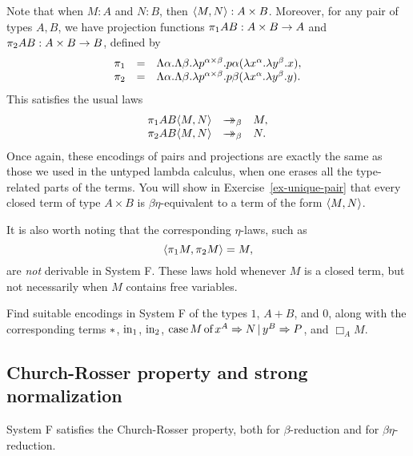 \documentclass{article}
\begin{document}
Note that when $M:A$ and $N:B$, then $\langle M,N\rangle:A\times B$. Moreover,
for any pair of types $A,B$, we have projection
functions $\pi_1 AB : A\times B\to A$ and $\pi_2 AB : A\times B\to
B$, defined by
\[ \begin{array}{ccl}
  \pi_1 &=& \Lambda\alpha.\Lambda\beta.\lambda p^{\alpha\times
    \beta}.p\alpha(\lambda x^{\alpha}.\lambda y^{\beta}.x),\\
  \pi_2 &=& \Lambda\alpha.\Lambda\beta.\lambda p^{\alpha\times
    \beta}.p\beta(\lambda x^{\alpha}.\lambda y^{\beta}.y).
\end{array}
\]
This satisfies the usual laws
\[ \begin{array}{ccl}
  \leftt AB\pair{M,N} &\redbs& M,\\
  \rightt AB\pair{M,N} &\redbs& N.
\end{array}
\]
Once again, these encodings of pairs and projections are exactly the
same as those we used in the untyped lambda calculus, when one erases
all the type-related parts of the terms. You will show in
Exercise~\ref{ex-unique-pair} that every closed term of type $A\times
B$ is $\beta\eta$-equivalent to a term of the form $\langle M,N\rangle$.

\begin{remark}
  It is also worth noting that the corresponding $\eta$-laws, such as
  \[  \langle\pi_1 M,\pi_2 M\rangle=M,
  \] are {\em not} derivable in System F. These laws hold whenever $M$
  is a closed term, but not necessarily when $M$ contains free
  variables.
\end{remark}

\begin{exercise}\label{ex-encodings}
  Find suitable encodings in System F of the types $1$, $A+B$, and
  $0$, along with the corresponding terms ${*}$, $\mbox{\rm in}_1$, $\mbox{\rm in}_2$,
  $\mathop{\mbox{\rm case}}M\mathop{\mbox{\rm of}}x^A\Rightarrow N\mathop{|}y^B\Rightarrow P$, and $\Box_A{M}$.
\end{exercise}

\subsection{Church-Rosser property and strong normalization}

\begin{theorem}
  System F satisfies the Church-Rosser property, both for
  $\beta$-reduction and for $\beta\eta$-reduction.
\end{theorem}
\end{document}
